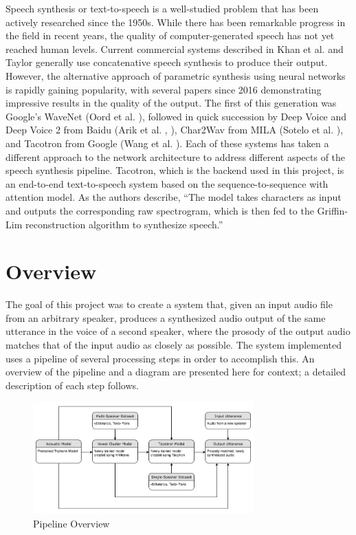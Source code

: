 \documentclass{article}
\begin{document}
Speech synthesis or text-to-speech is a well-studied problem that has been actively researched since the 1950s. While there has been remarkable progress in the field in recent years, the quality of computer-generated speech has not yet reached human levels. Current commercial systems described in Khan et al. \cite{khan2016concatenative} and Taylor  \cite{taylor2009text} generally use concatenative speech synthesis to produce their output. However, the alternative approach of parametric synthesis using neural networks is rapidly gaining popularity, with several papers since 2016 demonstrating impressive results in the quality of the output.
The first of this generation was Google's WaveNet (Oord et al. \cite{oord2016wavenet}), followed in quick succession by Deep Voice and Deep Voice 2 from Baidu (Arik et al. \cite{arik2017deep}, \cite{arik2017deep2}), Char2Wav from MILA (Sotelo et al. \cite{sotelo2017char2wav}), and Tacotron from Google (Wang et al. \cite{wang2017tacotron}).
Each of these systems has taken a different approach to the network architecture to address different aspects of the speech synthesis pipeline. Tacotron, which is the backend used in this project, is an end-to-end text-to-speech system based on the sequence-to-sequence with attention model. As the authors describe, ``The model takes characters as input and outputs the corresponding raw spectrogram, which is then fed to the Griffin-Lim reconstruction algorithm to synthesize speech.''

\section{Overview}
\label{sec:overview}
The goal of this project was to create a system that, given an input audio file from an arbitrary speaker, produces a synthesized audio output of the same utterance in the voice of a second speaker, where the prosody of the output audio matches that of the input audio as closely as possible.
The system implemented uses a pipeline of several processing steps in order to accomplish this.
An overview of the pipeline and a diagram are presented here for context; a detailed description of each step follows.

\begin{figure}[htb]

\begin{minipage}[b]{1.0\linewidth}
  \centering
  \centerline{\includegraphics[width=8.5cm]{Overall_Pipeline}}
\end{minipage}
\caption{Pipeline Overview}
\label{fig:overview}
\end{figure}
\end{document}
